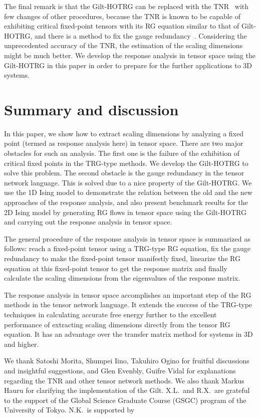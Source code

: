 \documentclass[aps,prb,reprint,superscriptaddress]{revtex4-2}
\begin{document}
The final remark is that the Gilt-HOTRG can be replaced with
the TNR~\cite{tnr,tnralgo} with few changes of other procedures, because
the TNR is known to be capable of exhibiting critical fixed-point
tensors with its RG equation similar to that of Gilt-HOTRG, and there is
a method to fix the gauge redundancy~\cite{tnralgo}. Considering the
unprecedented accuracy of the TNR, the estimation of the scaling dimensions
might be much better. We develop the response analysis in tensor space
using the Gilt-HOTRG in this paper in order to prepare for the further
applications to 3D systems.
%


\section{Summary and discussion\label{conclusion}}
In this paper, we show how to extract scaling dimensions by analyzing a
fixed point (termed as response analysis here) in tensor space. There are two
major obstacles for such an analysis. The first one is the failure of
the exhibition of critical fixed points in the TRG-type methods. We develop
the Gilt-HOTRG to solve this problem. The second obstacle is the
gauge redundancy in the tensor network language. This is solved due to a
nice property of the Gilt-HOTRG.  We use the 1D Ising model to demonstrate
the relation between the old and the new approaches of the response
analysis, and also present benchmark results for the 2D Ising model
by generating RG flows in tensor space using the Gilt-HOTRG and carrying out
the response analysis in tensor space. 
%

The general procedure of the response analysis in tensor space is summarized
as follows: reach a fixed-point tensor using a TRG-type RG equation, fix
the gauge redundancy to make the fixed-point tensor manifestly fixed,
linearize the RG equation at this fixed-point tensor to get the response
matrix and finally calculate the scaling dimensions from the
eigenvalues of the response matrix.
%

The response analysis in tensor space accomplishes an important step of
the RG methods in the tensor network language. It extends the success of
the TRG-type techniques in calculating accurate free energy further to
the excellent performance of extracting scaling dimensions directly from
the tensor RG equation. It has an advantage over the transfer matrix
method for systems in 3D and higher. 




\begin{acknowledgments}
We thank Satoshi Morita, Shumpei Iino, Takuhiro Ogino for fruitful
discussions and insightful suggestions, and Glen Evenbly, Guifre Vidal
for explanations regarding the TNR and other tensor network methods. We
also thank Markus Hauru for clarifying the implementation of the Gilt.
X.L.\ and R.X.\ are grateful to the support of the Global Science
Graduate Course (GSGC) program of the University of Tokyo. N.K.\ is
supported by

\end{acknowledgments}
\end{document}
